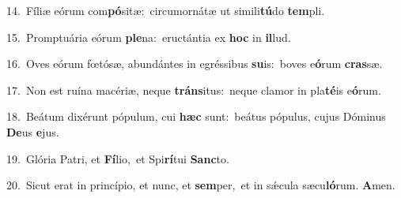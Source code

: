 {\numbfont\textcolor{\numbcolor}{14.}}~Fíliæ eórum com\-\textbf{pó}\-sitæ:~\star circumornátæ ut simili\-\textbf{tú}\-do \textbf{tem}\-pli.\par
{\numbfont\textcolor{\numbcolor}{15.}}~Promptuária eórum \textbf{ple}\-na:~\star eructántia ex \textbf{hoc} in \textbf{il}\-lud.\par
{\numbfont\textcolor{\numbcolor}{16.}}~Oves eórum fœtósæ, abundántes in egréssibus \textbf{su}\-is:~\star boves e\-\textbf{ó}\-rum \textbf{cras}\-sæ.\par
{\numbfont\textcolor{\numbcolor}{17.}}~Non est ruína macériæ, neque \textbf{tráns}\-itus:~\star neque clamor in pla\-\textbf{té}\-is e\-\textbf{ó}\-rum.\par
{\numbfont\textcolor{\numbcolor}{18.}}~Beátum dixérunt pópulum, cui \textbf{hæc} sunt:~\star beátus pópulus, cujus Dóminus \textbf{De}\-us \textbf{e}\-jus.\par
{\numbfont\textcolor{\numbcolor}{19.}}~Glória Patri, et \textbf{Fí}\-lio,~\star et Spi\-\textbf{rí}\-tui \textbf{Sanc}\-to.\par
{\numbfont\textcolor{\numbcolor}{20.}}~Sicut erat in princípio, et nunc, et \textbf{sem}\-per,~\star et in sǽcula sæcu\-\textbf{ló}\-rum. \textbf{A}\-men.\par
